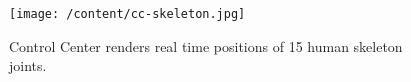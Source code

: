 \begin{figure}
	[h] \centering 
	\texttt{[image: /content/cc-skeleton.jpg]} 
	\caption{Control Center renders real time positions of 15 human skeleton joints.} 
	\label{fg:cc:skeleton} 
\end{figure}